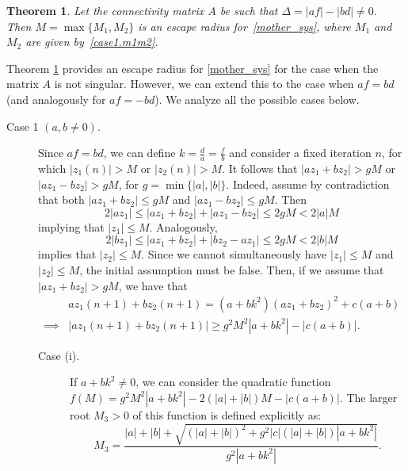 \documentclass[10pt]{article}
\newtheorem{thm}{Theorem}[section]
\begin{document}
\begin{thm} \label{thm.escape.radius}
Let the connectivity matrix $A$ be such that $\Delta = |a f| - |bd| \neq 0$. Then $M = \max\{M_1, M_2\}$ is an escape radius for~\eqref{mother_sys}, where $M_1$ and $M_2$ are given by~\eqref{case1.m1m2}.
\end{thm}

Theorem \ref{thm.escape.radius} provides an escape radius for \eqref{mother_sys}
for the case when the matrix $A$ is not singular. However, we can extend this to
the case when $a f = b d$ (and analogously for $a f = - b d$). We analyze all the possible cases below.

\begin{description}
\item[Case 1 $(a, b \neq 0)$.]
Since $a f = b d$, we can define $k = \frac{d}{a} = \frac{f}{b}$ and consider a fixed iteration $n$, for which $|z_1(n)| > M$ or $|z_2(n)| > M$. It follows that $|a z_1 + b z_2| > g M$ or $|a z_1 - b z_2| > g M$, for $g = \min\{|a|, |b|\}$. Indeed, assume by contradiction that both $|a z_1 + bz_2| \leq g M$ and $|a z_1 - b z_2| \leq g M$. Then
\begin{equation*}
2|az_1 | \leq |az_1 + bz_2 | + |az_1-bz_2 | \leq 2gM < 2 |a | M
\end{equation*}
implying that $|z_1| \leq M$. Analogously,
\begin{equation*}
2|bz_1 | \leq |az_1 + bz_2 | + |bz_2- az_1 | \leq 2gM < 2 |b | M
\end{equation*}
implies that $|z_2| \leq M$. Since we cannot simultaneously have $|z_1| \leq M$ and $|z_2| \leq M$, the initial assumption must be false. Then, if we assume that $|a z_1 + b z_2| > g M$, we have that
\[
\begin{aligned}
& a z_1(n + 1) + b z_2(n + 1) = (a + b k^2) (a z_1 + b z_2)^2 + c (a + b) \\
\implies & |a z_1(n + 1) + b z_2(n + 1)| \geq g^2 M^2 |a + b k^2| - |c (a + b)|.
\end{aligned}
\]

\begin{description}
    \item[Case (i).] If $a + b k^2 \neq 0$, we can consider the quadratic function $f(M) = g^2M^2 |a+bk^2| -2(|a | + |b |)M - |c(a+b) |$. The larger root $M_3 > 0$ of this function is defined explicitly as:
    \begin{equation*}
    M_3 = \frac{|a| + |b| + \sqrt{(|a| + |b|)^2 + g^2 |c| (|a| + |b|) |a + b k^2|}}{g^2 |a + b k^2|}.
    \end{equation*}


\end{description}
\end{description}
\end{document}
